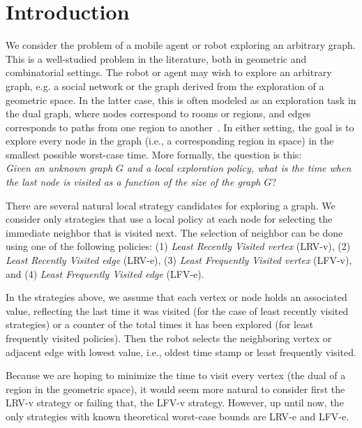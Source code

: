 \section{Introduction}
\label{sec:Introduction}

We consider the problem of a mobile agent or robot exploring an arbitrary graph.
This is a well-studied problem in the literature, both in geometric and combinatorial
settings. The robot or agent may wish to explore an arbitrary graph, e.g.
a social network or the graph derived from the exploration of a geometric space.
In the latter case, this is often modeled as an exploration task
in the dual graph, where nodes correspond to rooms or regions, and edges corresponds
to paths from one region to another~\cite{bfk+-tueur-13,flm+-prssr-14,lbf+-estmr-14}.
In either setting, the goal is to explore every node in the graph (i.e., a
corresponding region in space) in the smallest possible worst-case time.
More formally, the question is this: \\
\emph{Given an unknown graph $G$ and a local exploration
policy, what is the time when the last node is visited as a function of
the size of the graph $G$}?





There are several natural local strategy candidates for exploring a graph.
We consider only strategies that use a local policy at each node
for selecting the immediate neighbor that is visited next.
The selection of neighbor can be done using one of the following policies:
(1) {\em Least Recently Visited vertex} (LRV-v), (2) {\em Least Recently Visited edge} (LRV-e),
(3) {\em Least Frequently Visited vertex} (LFV-v), and (4) {\em Least Frequently Visited edge} (LFV-e).


In the strategies above, we assume that each vertex or node holds an associated value,
reflecting the last time it was visited (for the case of least recently visited strategies)
or a counter of the total times it has been explored (for least frequently visited
policies). Then the robot selects the neighboring vertex or adjacent edge
with lowest value, i.e., oldest time stamp or least frequently visited.

Because we are hoping to minimize the time to visit every vertex (the dual of a region
in the geometric space), it would seem
more natural to consider first the LRV-v strategy or failing that, the LFV-v strategy.
However, up until now, the only strategies with known theoretical worst-case
bounds are LRV-e and LFV-e.


